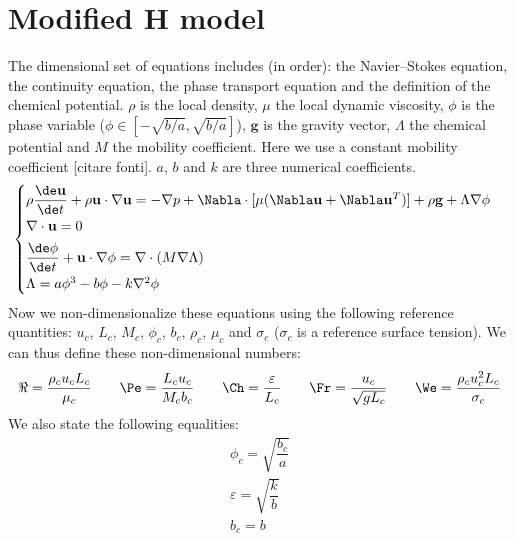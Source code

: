 \chapter{Modified H model}




The dimensional set of equations includes (in order): the Navier--Stokes equation, the continuity equation, the phase transport equation and the definition of the chemical potential. $\rho$ is the local density, $\mu$ the local dynamic viscosity, $\phi$ is the phase variable ($\phi \in [-\sqrt{b/a},\sqrt{b/a}]$), $\mathbf g$ is the gravity vector, $\Lambda$ the chemical potential and $M$ the mobility coefficient. Here we use a constant mobility coefficient [citare fonti]. $a$, $b$ and $k$ are three numerical coefficients. 
\begin{equation}
\begin{cases}
\rho \dfrac{\de \mathbf u}{\de t} +\rho \mathbf u \cdot \nabla \mathbf u =-\nabla p +\Nabla\cdot[\mu (\Nabla\mathbf u+\Nabla\mathbf u^T)]+\rho\mathbf g+\Lambda \nabla\phi\\[1ex]
\nabla\cdot \mathbf u =0\\[1ex]
\dfrac{\de \phi}{\de t} +\mathbf u \cdot \nabla \phi=\nabla\cdot(M\nabla \Lambda) \\[1ex]
\Lambda=a \phi^3-b \phi-k\nabla^2 \phi
\end{cases}
\label{eq: dim_modh}
\end{equation}
Now we non-dimensionalize these equations using the following reference quantities: $u_c$, $L_c$, $M_c$, $\phi_c$, $b_c$, $\rho_c$, $\mu_c$ and $\sigma_c$ ($\sigma_c$ is a reference surface tension). We can thus define these non-dimensional numbers:
\[
\begin{array}{ccccccccc}
\Re=\dfrac{\rho_c u_cL_c}{\mu_c} &&\Pe=\dfrac{L_cu_c}{M_c b_c} && \Ch=\dfrac{\varepsilon}{L_c}&& \Fr=\dfrac{u_c}{\sqrt{gL_c}}&& \We=\dfrac{\rho_cu_c^2L_c}{\sigma_c}
\end{array}
\]
We also state the following equalities:
\[
\begin{array}{l}
\phi_c=\sqrt{\dfrac{b_c}{a}}\\[2ex]
\varepsilon=\sqrt{\dfrac{k}{b}}\\[2ex]
b_c=b
\end{array}
\]
